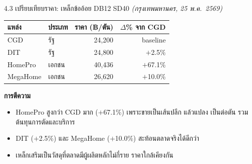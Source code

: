 \documentclass[aspectratio=169,11pt]{beamer}
\begin{document}
\begin{frame}{4.3 เปรียบเทียบราคา: เหล็กข้ออ้อย DB12 SD40}
  \footnotesize
  \textit{(กรุงเทพมหานคร, 25 พ.ค.~2569)}
  \begin{table}
    \centering
    \begin{tabularx}{\textwidth}{l X r r}
      \toprule
      \textbf{แหล่ง} & \textbf{ประเภท} & \textbf{ราคา (฿/ตัน)} & \textbf{$\Delta$\% จาก CGD} \\
      \midrule
      CGD       & รัฐ    & 24{,}200 & baseline \\
      DIT       & รัฐ    & 24{,}800 & $+$2.5\% \\
      HomePro   & เอกชน  & 40{,}436 & $+$67.1\% \\
      MegaHome  & เอกชน  & 26{,}620 & $+$10.0\% \\
      \bottomrule
    \end{tabularx}
  \end{table}
  \vspace{0.3em}
  \textbf{การตีความ}
  \begin{itemize}
    \item HomePro สูงกว่า CGD มาก ($+$67.1\%) เพราะขายเป็นเส้นปลีก แล้วแปลง
          เป็นต่อตัน รวมต้นทุนการตัดและบริการ
    \item DIT ($+$2.5\%) และ MegaHome ($+$10.0\%) สะท้อนตลาดจริงได้ดีกว่า
    \item เหล็กเสริมเป็นวัสดุที่ตลาดมีผู้ผลิตหลักไม่กี่ราย ราคาใกล้เคียงกัน
  \end{itemize}
\end{frame}
\end{document}
